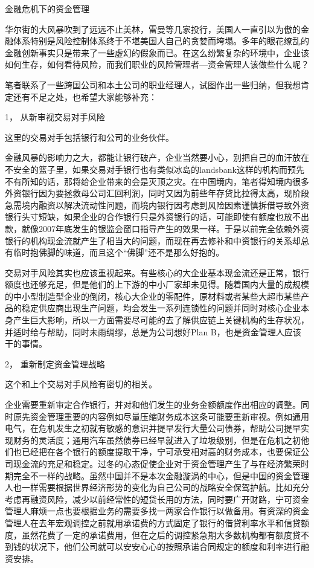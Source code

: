     金融危机下的资金管理

    华尔街的大风暴吹到了远远不止美林，雷曼等几家投行，美国人一直引以为傲的金融体系特别是风险控制体系终于不堪美国人自己的贪婪而垮塌。多年的眼花缭乱的金融创新事实只是带来了一些虚幻的假象而已。在这么纷繁复杂的环境中，企业该如何生存，如何看待风险，而我们职业的风险管理者—资金管理人该做些什么呢？

    笔者联系了一些跨国公司和本土公司的职业经理人，试图作出一些归纳，但我想肯定还有不足之处，也希望大家能够补充：

    1， 从新审视交易对手风险

    这里的交易对手包括银行和公司的业务伙伴。

    金融风暴的影响力之大，都能让银行破产，企业当然要小心，别把自己的血汗放在不安全的篮子里，如果交易对手银行也有类似冰岛的landsbank这样的机构而预先不有所知的话，那将给企业带来的会是灭顶之灾。在中国境内，笔者得知境内很多外资银行因为要拯救母公司汇回利润，同时又因为前些年存贷比拉得太高，现阶段急需境内融资以解决流动性问题，而境内银行因考虑到风险因素谨慎拆借导致外资银行头寸短缺，如果企业的合作银行只是外资银行的话，可能即使有额度也放不出款，就像2007年底发生的银监会窗口指导产生的效果一样。于是以前完全依赖外资银行的机构现金流就产生了相当大的问题，而现在再去修补和中资银行的关系却总有临时抱佛脚的味道，而且这个“佛脚”还不是那么好抱的。

    交易对手风险其实也应该重视起来。有些核心的大企业基本现金流还是正常，银行额度也还够充足，但是他们的上下游的中小厂家却未见得。随着国内大量的成规模的中小型制造型企业的倒闭，核心大企业的零配件，原材料或者某些大超市某些产品的稳定供应商出现生产问题，均会发生一系列连锁性的问题并同时对核心企业本身产生巨大影响，所以一方面需要尽可能的去了解供应链上关键机构的生存状况，并适时给与帮助，同时未雨绸缪，总是为公司想好Plan B，也是资金管理人应该干的事情。

    2， 重新制定资金管理战略

    这个和上个交易对手风险有密切的相关。

    企业需要重新审定合作银行，并对和他们发生的业务金额额度作出相应的调整。同时原先资金管理重要的内容例如尽量压缩财务成本这条可能要重新审视。例如通用电气，在危机发生之初就有敏感的意识并提早发行大量公司债券，帮助公司提早实现财务的灵活度；通用汽车虽然债券已经早就进入了垃圾级别，但是在危机之初他们也已经把在各个银行的额度提取干净，宁可承受相对高的财务成本，也要保证公司现金流的充足和稳定。过冬的心态促使企业对于资金管理产生了与在经济繁荣时期完全不一样的战略。虽然中国并不是本次金融漩涡的中心，但是中国的资金管理人也一样需要根据世界经济形势的变化为自己公司的战略安全保驾护航。比如充分考虑再融资风险，减少以前经常性的短贷长用的方法，同时要广开财路，宁可资金管理人麻烦一点也要根据业务的需要多找一两家合作银行以做备用。有资深的资金管理人在去年宏观调控之前就用承诺费的方式固定了银行的借贷利率水平和信贷额度，虽然花费了一定的承诺费用，但在之后的调控紧急期大多数机构都有额度贷不到钱的状况下，他们公司就可以安安心心的按照承诺合同规定的额度和利率进行融资安排。

